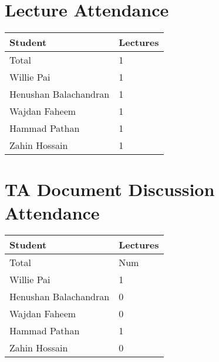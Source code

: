 \documentclass{article}
\begin{document}

\section{Lecture Attendance}


\begin{table}[H]
\centering
\begin{tabular}{ll}
\toprule
\textbf{Student} & \textbf{Lectures}\\
\midrule
Total & 1\\
Willie Pai & 1\\
Henushan Balachandran & 1\\
Wajdan Faheem & 1\\
Hammad Pathan & 1\\
Zahin Hossain & 1\\
\bottomrule
\end{tabular}
\end{table}


\section{TA Document Discussion Attendance}


\begin{table}[H]
\centering
\begin{tabular}{ll}
\toprule
\textbf{Student} & \textbf{Lectures}\\
\midrule
Total & Num\\
Willie Pai & 1\\
Henushan Balachandran & 0\\
Wajdan Faheem & 0\\
Hammad Pathan & 1\\
Zahin Hossain & 0\\
\bottomrule
\end{tabular}
\end{table}
\end{document}

